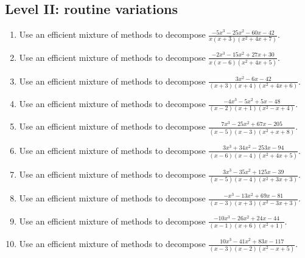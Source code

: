 \documentclass[11pt,oneside]{book}
\begin{document}
\subsection*{Level II: routine variations}
\begin{enumerate}[leftmargin=*,label=\textbf{\arabic*.},itemsep=0.65\baselineskip]
\item Use an efficient mixture of methods to decompose $\displaystyle \frac{- 5 x^{3} - 25 x^{2} - 60 x - 42}{x \left(x + 3\right) \left(x^{2} + 4 x + 7\right)}$.
\item Use an efficient mixture of methods to decompose $\displaystyle \frac{- 2 x^{3} - 15 x^{2} + 27 x + 30}{x \left(x - 6\right) \left(x^{2} + 4 x + 5\right)}$.
\item Use an efficient mixture of methods to decompose $\displaystyle \frac{3 x^{2} - 6 x - 42}{\left(x + 3\right) \left(x + 4\right) \left(x^{2} + 4 x + 6\right)}$.
\item Use an efficient mixture of methods to decompose $\displaystyle \frac{- 4 x^{3} - 5 x^{2} + 5 x - 48}{\left(x - 2\right) \left(x + 1\right) \left(x^{2} - x + 4\right)}$.
\item Use an efficient mixture of methods to decompose $\displaystyle \frac{7 x^{3} - 25 x^{2} + 67 x - 205}{\left(x - 5\right) \left(x - 3\right) \left(x^{2} + x + 8\right)}$.
\item Use an efficient mixture of methods to decompose $\displaystyle \frac{3 x^{3} + 34 x^{2} - 253 x - 94}{\left(x - 6\right) \left(x - 4\right) \left(x^{2} + 4 x + 5\right)}$.
\item Use an efficient mixture of methods to decompose $\displaystyle \frac{3 x^{3} - 35 x^{2} + 125 x - 39}{\left(x - 5\right) \left(x - 4\right) \left(x^{2} + 3 x + 3\right)}$.
\item Use an efficient mixture of methods to decompose $\displaystyle \frac{- x^{3} - 13 x^{2} + 69 x - 81}{\left(x - 3\right) \left(x + 3\right) \left(x^{2} - 3 x + 3\right)}$.
\item Use an efficient mixture of methods to decompose $\displaystyle \frac{- 10 x^{3} - 26 x^{2} + 24 x - 44}{\left(x - 1\right) \left(x + 6\right) \left(x^{2} + 1\right)}$.
\item Use an efficient mixture of methods to decompose $\displaystyle \frac{10 x^{3} - 41 x^{2} + 83 x - 117}{\left(x - 3\right) \left(x - 2\right) \left(x^{2} - x + 5\right)}$.
\end{enumerate}
\end{document}
